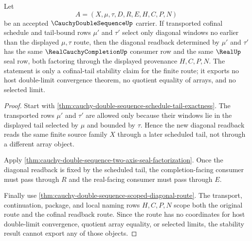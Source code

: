 \begin{theorem}
\label{thm:cauchy-double-sequence-cofinal-tail-stability}
Let
$$
A=(X,\mu,\tau,D,R,E,H,C,P,N)
$$
be an accepted $\CauchyDoubleSequenceUp$ carrier. If transported cofinal schedule and tail-bound rows $\mu'$ and $\tau'$ select only diagonal windows no earlier than the displayed $\mu,\tau$ route, then the diagonal readback determined by $\mu'$ and $\tau'$ has the same $\RealCauchyCompletionUp$ consumer row and the same $\RealUp$ seal row, both factoring through the displayed provenance $H,C,P,N$. The statement is only a cofinal-tail stability claim for the finite route; it exports no host double-limit convergence theorem, no quotient equality of arrays, and no selected limit.
\end{theorem}
\begin{proof}
Start with \autoref{thm:cauchy-double-sequence-schedule-tail-exactness}. The transported rows $\mu'$ and $\tau'$ are allowed only because their windows lie in the displayed tail selected by $\mu$ and bounded by $\tau$. Hence the new diagonal readback reads the same finite source family $X$ through a later scheduled tail, not through a different array object.

Apply \autoref{thm:cauchy-double-sequence-two-axis-seal-factorization}. Once the diagonal readback is fixed by the scheduled tail, the completion-facing consumer must pass through $R$ and the real-facing consumer must pass through $E$.

Finally use \autoref{thm:cauchy-double-sequence-scoped-diagonal-route}. The transport, continuation, package, and local naming rows $H,C,P,N$ scope both the original route and the cofinal readback route. Since the route has no coordinates for host double-limit convergence, quotient array equality, or selected limits, the stability result cannot export any of those objects.
\end{proof}

